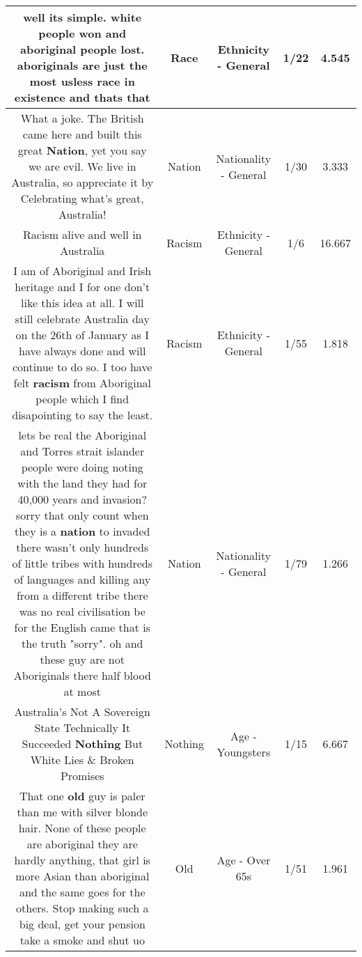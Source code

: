 \documentclass[11pt]{article}
\newlength\mylength
\begin{document}
\begin{center}
\begin{longtable}{|C{.65\mylength}|C{.30\mylength}|C{.12\mylength}|C{.12\mylength}|C{.12\mylength}|}
  \small well its simple. white people won and aboriginal people lost. aboriginals are just the most usless \textbf{race} in existence and thats that\normalsize   & Race & Ethnicity - General & 1/22 & 4.545 \\  \hline
  \small What a joke. The British came here and built this great \textbf{Nation}, yet you say we are evil. We live in Australia, so appreciate it by Celebrating what's great, Australia!\normalsize   & Nation & Nationality - General & 1/30 & 3.333 \\  \hline
  \small Racism alive and well in Australia\normalsize   & Racism & Ethnicity - General & 1/6 & 16.667 \\  \hline
  \small I am of Aboriginal and Irish heritage and I for one don't like this idea at all. I will still celebrate Australia day on the 26th of January as I have always done and will continue to do so. I too have felt \textbf{racism} from Aboriginal people which I find disapointing to say the least.\normalsize   & Racism & Ethnicity - General & 1/55 & 1.818 \\  \hline
  \small lets be real the Aboriginal and Torres strait islander people were doing noting with the land they had for 40,000 years and invasion? sorry that only count when they is a \textbf{nation} to invaded there wasn't only hundreds of little tribes with hundreds of languages and killing any from a different tribe there was no real civilisation  be for the English came that is the truth "sorry". oh and these guy are not Aboriginals there half blood at most\normalsize   & Nation & Nationality - General & 1/79 & 1.266 \\  \hline
  \small Australia's Not A Sovereign State Technically It Succeeded \textbf{Nothing} But White Lies \& Broken Promises\normalsize   & Nothing & Age - Youngsters & 1/15 & 6.667 \\  \hline
  \small That one \textbf{old} guy is paler than me with silver blonde hair. None of these people are aboriginal they are hardly anything, that girl is more Asian than aboriginal and the same goes for the others. Stop making such a big deal, get your pension take a smoke and shut uo\normalsize   & Old & Age - Over 65s & 1/51 & 1.961 \\  \hline

\end{longtable}
\end{center}
\end{document}
